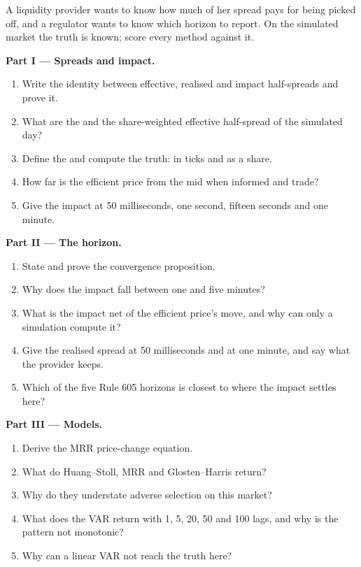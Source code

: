 \begin{problem}\label{pb:mx:decomposing-the-spread:1}
A liquidity provider wants to know how much of her spread pays for being picked off, and a regulator wants to know which horizon to report. On the
simulated market the truth is known; score every method against it.

\medskip\noindent\textbf{Part I --- Spreads and impact.}
\begin{enumerate}
\item Write the identity between effective, realised and impact half-spreads and prove it.
\item What are the  and the share-weighted effective half-spread of the simulated day?
\item Define the  and compute the truth: in ticks and as a share.
\item How far is the efficient price from the mid when informed and  trade?
\item Give the impact at 50 milliseconds, one second, fifteen seconds and one minute.
\end{enumerate}

\medskip\noindent\textbf{Part II --- The horizon.}
\begin{enumerate}[resume]
\item State and prove the convergence proposition.
\item Why does the impact fall between one and five minutes?
\item What is the impact net of the efficient price's move, and why can only a simulation compute it?
\item Give the realised spread at 50 milliseconds and at one minute, and say what the provider keeps.
\item Which of the five Rule 605 horizons is closest to where the impact settles here?
\end{enumerate}

\medskip\noindent\textbf{Part III --- Models.}
\begin{enumerate}[resume]
\item Derive the MRR price-change equation.
\item What do Huang--Stoll, MRR and Glosten--Harris return?
\item Why do they understate adverse selection on this market?
\item What does the VAR return with 1, 5, 20, 50 and 100 lags, and why is the pattern not monotonic?
\item Why can a linear VAR not reach the truth here?
\end{enumerate}


\end{problem}
